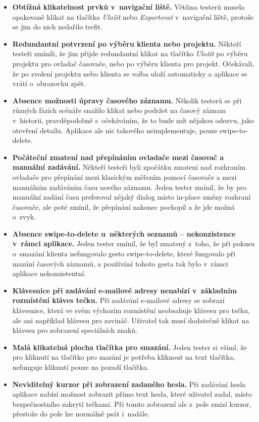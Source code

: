 \begin{itemize}
\item\textbf{Obtížná klikatelnost prvků v~navigační liště.} Většina testerů musela opakovaně klikat na tlačítka \emph{Uložit} nebo \emph{Exportovat} v~navigační liště, protože se jim do nich nedařilo trefit.
\item\textbf{Redundantní potvrzení po výběru klienta nebo projektu.} Někteří testeři zmínili, že jim přijde redundantní klikat na tlačítko \emph{Uložit} po výběru projektu pro ovladač časovače, nebo po výběru klienta pro projekt. Očekávali, že po zvolení projektu nebo klienta se volba uloží automaticky a aplikace se vrátí o~obrazovku zpět.
\item\textbf{Absence možnosti úpravy časového záznamu.} Několik testerů se při různých fázích scénáře snažilo klikat nebo podržet na časový záznam v~historii, pravděpodobně s~očekáváním, že to bude mít nějakou odezvu, jako otevření detailu. Aplikace ale nic takového neimplementuje, pouze swipe-to-delete.
\item\textbf{Počáteční zmatení nad přepínáním ovladače mezi časovač a manuální zadávání.} Někteří testeři byli zpočátku zmateni nad rozhraním ovladače pro přepínání mezi klasickým měřením pomocí časovače a mezi manuálním zadáváním času nového záznamu. Jeden tester zmínil, že by pro manuální zadání času preferoval nějaký dialog místo in-place změny rozhraní časovače, ale poté zmínil, že přepínání nakonec pochopil a že jde možná o~zvyk.
\item\textbf{Absence swipe-to-delete u~některých seznamů – nekonzistence v~rámci aplikace.} Jeden tester zmínil, že byl zmatený z~toho, že při pokusu o~smazání klienta nefungovalo gesto swipe-to-delete, které fungovalo při mazání časových záznamů, a používání tohoto gesta tak bylo v~rámci aplikace nekonzistentní.
\item\textbf{Klávesnice při zadávání e-mailové adresy nenabízí v~základním rozmístění kláves tečku.} Při zadávání e-mailové adresy se zobrazí klávesnice, která ve svém výchozím rozmístění neobsahuje klávesu pro tečku, ale ani například klávesu pro zavináč. Uživatel tak musí dodatečně klikat na klávesu pro zobrazení speciálních znaků.
\item\textbf{Malá klikatelná plocha tlačítka pro smazání.} Jeden tester si všiml, že pro kliknutí na tlačítko pro mazání je potřeba kliknout na text tlačítka, nefunguje kliknutí pouze na pozadí tlačítka.
\item\textbf{Neviditelný kurzor při zobrazení zadaného hesla.} Při zadávání hesla aplikace nabízí možnost zobrazit přímo text hesla, které uživatel zadal, místo bezpečnostního zakrytí tečkami. Při tomto zobrazení ale z~pole zmizí kurzor, přestože do pole lze normálně psát i~nadále.

\end{itemize}
